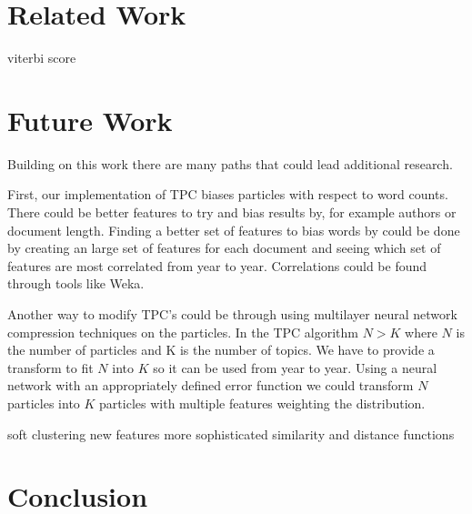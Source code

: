 \documentclass[conference]{IEEEtran}
\begin{document}
\section{Related Work}
viterbi score
\section{Future Work}
Building on this work there are many paths that could lead additional research.

First, our implementation of TPC biases particles with respect to word counts. There could be better features to try and bias results by, for example authors or document length. Finding a better set of features to bias words by could be done by creating an large set of features for each document and seeing which set of features are most correlated from year to year. Correlations could be found through tools like Weka. 

Another way to modify TPC's could be through using multilayer neural network compression techniques on the particles. In the TPC algorithm $N>K$ where $N$ is the number of particles and K is the number of topics. We have to provide a transform to fit $N$ into $K$ so it can be used from year to year. Using a neural network with an appropriately defined error function we could transform $N$ particles into $K$ particles with multiple features weighting the distribution.


soft clustering
new features
more sophisticated similarity and distance functions

\section{Conclusion}
\end{document}
